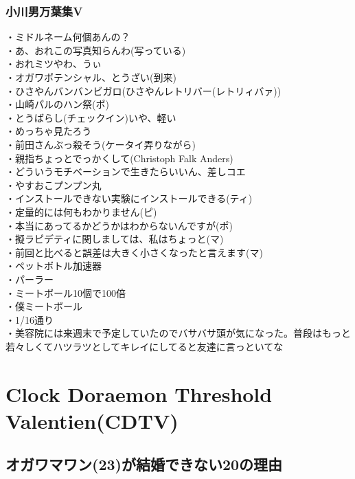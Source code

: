 \documentclass[12pt]{jsarticle}
\begin{document}
\subsubsection{小川男万葉集V}
・ミドルネーム何個あんの？\\
・あ、おれこの写真知らんわ(写っている)\\
・おれミツやわ、うぃ\\
・オガワポテンシャル、とうざい(到来)\\
・ひさやんバンバンビガロ(ひさやんレトリバー(レトリィバァ))\\
・山崎パルのハン祭(ポ)\\
・とうばらし(チェックイン)いや、軽い\\
・めっちゃ見たろう\\
・前田さんぶっ殺そう(ケータイ弄りながら)\\
・親指ちょっとでっかくして(Christoph Falk Anders)\\
・どういうモチベーションで生きたらいいん、差しコエ\\
・やすおこプンプン丸\\
・インストールできない実験にインストールできる(ティ)\\
・定量的には何もわかりません(ピ)\\
・本当にあってるかどうかはわからないんですが(ポ)\\
・擬ラピデティに関しましては、私はちょっと(マ)\\
・前回と比べると誤差は大きく小さくなったと言えます(マ)\\
・ペットボトル加速器\\
・パーラー\\
・ミートボール10個で100倍\\
・僕ミートボール\\
・1/16通り\\
・美容院には来週末で予定していたのでバサバサ頭が気になった。普段はもっと若々しくてハツラツとしてキレイにしてると友達に言っといてな\\


\newpage
\section{Clock Doraemon Threshold Valentien(CDTV)}
\subsection{オガワマワン(23)が結婚できない20の理由}
\end{document}

